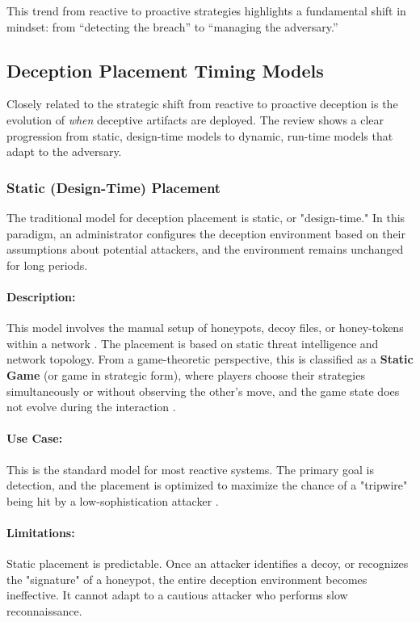 This trend from reactive to proactive strategies highlights a fundamental shift in
mindset: from ``detecting the breach'' to ``managing the adversary.''


\subsection{Deception Placement Timing Models}

Closely related to the strategic shift from reactive to proactive deception is the evolution of \textit{when}
deceptive artifacts are deployed. The review shows a clear progression from static, design-time models to
dynamic, run-time models that adapt to the adversary.

\subsubsection{Static (Design-Time) Placement}

The traditional model for deception placement is static, or "design-time." In this paradigm, an administrator
configures the deception environment based on their assumptions about potential attackers, and the environment
remains unchanged for long periods.

\paragraph{Description:} This model involves the manual setup of honeypots, decoy files, or honey-tokens within
a network \cite{spitzner2002honeypots,provos2004virtual}. The placement is based on static threat intelligence
and network topology. From a game-theoretic perspective, this is classified as a \textbf{Static Game}
(or game in strategic form), where players choose their strategies simultaneously or without observing the
other's move, and the game state does not evolve during the interaction \cite{pawlick2019game}.

\paragraph{Use Case:} This is the standard model for most reactive systems. The primary goal is detection,
and the placement is optimized to maximize the chance of a "tripwire" being hit by a low-sophistication attacker
\cite{nawrocki2016survey}.

\paragraph{Limitations:} Static placement is predictable. Once an attacker identifies a decoy, or recognizes
the "signature" of a honeypot, the entire deception environment becomes ineffective. It cannot adapt to a
cautious attacker who performs slow reconnaissance.

